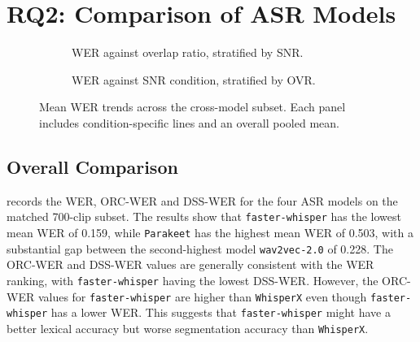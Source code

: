 \section{RQ2: Comparison of ASR Models}
\label{sec:rq2_comparison_of_asr_models}

\begin{figure}[htbp]
    \centering
    \begin{subfigure}[t]{0.49\linewidth}
        \centering
        \caption{WER against overlap ratio, stratified by SNR.}
        \label{fig:stat_cross_model_wer_vs_ovr}
    \end{subfigure}
    \hfill
    \begin{subfigure}[t]{0.49\linewidth}
        \centering
        \caption{WER against SNR condition, stratified by OVR.}
        \label{fig:stat_cross_model_wer_vs_snr}
    \end{subfigure}
    \caption{Mean WER trends across the cross-model subset. Each panel includes condition-specific lines and an overall pooled mean.}
    \label{fig:stat_cross_model_wer_trends}
\end{figure}

\subsection{Overall Comparison}
 records the WER, ORC-WER and DSS-WER for the four ASR models on the matched 700-clip subset. The results show that \texttt{faster-whisper} has the lowest mean WER of  0.159, while \texttt{Parakeet} has the highest mean WER of 0.503, with a substantial gap between the second-highest model \texttt{wav2vec-2.0} of 0.228. The ORC-WER and DSS-WER values are generally consistent with the WER ranking, with \texttt{faster-whisper} having the lowest DSS-WER. However, the ORC-WER values for \texttt{faster-whisper} are higher than \texttt{WhisperX} even though \texttt{faster-whisper} has a lower WER. This suggests that \texttt{faster-whisper} might have a better lexical accuracy but worse segmentation accuracy than \texttt{WhisperX}.

